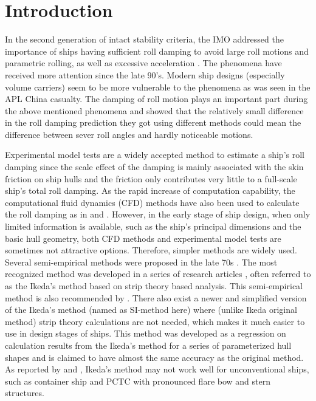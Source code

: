 \section{Introduction}
\label{se:introduction}

In the second generation of intact stability criteria, the IMO addressed the importance of ships having sufficient roll damping to avoid large roll motions and parametric rolling, as well as excessive acceleration \parencite{imo_finalization_2016}. The phenomena have received more attention since the late 90’s. Modern ship designs (especially volume carriers) seem to be more vulnerable to the phenomena as was seen in the APL China casualty. The damping of roll motion plays an important part during the above mentioned phenomena and \parencite{soder_ikeda_2019} showed that the relatively small difference in the roll damping prediction they got using different methods could mean the difference between sever roll angles and hardly noticeable motions. 

Experimental model tests are a widely accepted method to estimate a ship's roll damping since the scale effect of the damping is mainly associated with the skin friction on ship hulls and the friction only contributes very little to a full-scale ship's total roll damping\parencite{imo_1200_2006}. As the rapid increase of computation capability, the computational fluid dynamics (CFD) methods have also been used to calculate the roll damping as in \parencite{kristiansen_experimental_2014} and \parencite{henry_peter_piehl_ship_2016}.  
However, in the early stage of ship design, when only limited information is available, such as the ship's principal dimensions and the basic hull geometry, both CFD methods and experimental model tests are sometimes not attractive options. Therefore, simpler methods are widely used. 
Several semi-empirical methods were proposed in the late 70s \parencite{himeno_prediction_1981}. The most recognized method was developed in a series of research articles \parencite{ikeda_roll_1978,ikeda_eddy_1978,ikeda_roll_1979,ikeda_components_1978,ikeda_velocity_1979}, often referred to as the Ikeda's method based on strip theory based analysis. This semi-empirical method is also recommended by \parencite{ittc_ittc_2011}. 
There also exist a newer and simplified version of the Ikeda's method \parencite{kawahara_simple_2011} (named as SI-method here) where (unlike Ikeda original method) strip theory calculations are not needed, which makes it much easier to use in design stages of ships. This method was developed as a regression on calculation results from the Ikeda's method for a series of parameterized hull shapes and is claimed to have almost the same accuracy as the original method. As reported by  \parencite{kawahara_simple_2011} and \parencite{soder_ikeda_2019}, Ikeda's method may not work well for unconventional ships, such as container ship and PCTC with pronounced flare bow and stern structures. 

